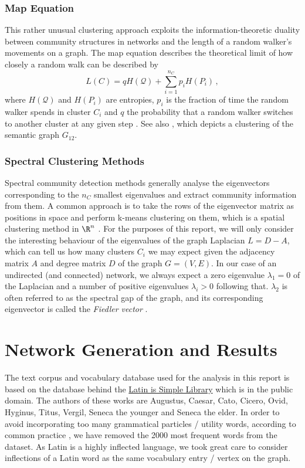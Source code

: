 \documentclass[12pt, a4paper]{article}
\begin{document}
  \subsubsection{Map Equation}
  \label{sec:mapequation}
  This rather unusual clustering approach exploits the information-theoretic duality between community structures in networks and the length of a random walker's movements on a graph.
  The map equation describes the theoretical limit of how closely a random walk can be described by $$L(C) = q H(\mathcal{Q}) + \sum_{i=1}^{n_C} p_i H(P_i)\,,$$
  where $H(\mathcal{Q})$ and $H(P_i)$ are entropies, $p_i$ is the fraction of time the random walker spends in cluster $C_i$ and $q$ the probability that a random walker switches to another cluster at any given step \parencite{mapequation}.
  See also , which depicts a clustering of the semantic graph $G_{12}$.

  \subsubsection{Spectral Clustering Methods}
  \label{sec:spectral-clustering}
  Spectral community detection methods generally analyse the eigenvectors corresponding to the $n_C$ smallest eigenvalues and extract community information from them. A common approach is to take the rows of the eigenvector matrix as positions in space and perform k-means clustering on them, which is a spatial clustering method in $\R^n$ \parencite{fortunato}.
  For the purposes of this report, we will only consider the interesting behaviour of the eigenvalues of the graph Laplacian $L = D - A$, which can tell us how many clusters $C_i$ we may expect given the adjacency matrix $A$ and degree matrix $D$ of the graph $G = (V, E)$.
  In our case of an undirected (and connected) network, we always expect a zero eigenvalue $\lambda_1 = 0$ of the Laplacian and a number of positive eigenvalues $\lambda_i > 0$ following that. $\lambda_2$ is often referred to as the spectral gap of the graph, and its corresponding eigenvector is called the \textit{Fiedler vector} \parencite{grindrod-lecture-notes}.

  \section{Network Generation and Results}
  The text corpus and vocabulary database used for the analysis in this report is based on the database behind the \href{https://www.latin-is-simple.com/en/library/}{Latin is Simple Library} which is in the public domain. The authors of these works are Augustus, Caesar, Cato, Cicero, Ovid, Hyginus, Titus, Vergil, Seneca the younger and Seneca the elder.
  In order to avoid incorporating too many grammatical particles / utility words, according to common practice \parencite{cw-biemann}, we have removed the 2000 most frequent words from the dataset.
  As Latin is a highly inflected language, we took great care to consider inflections of a Latin word as the same vocabulary entry / vertex on the graph.
\end{document}
